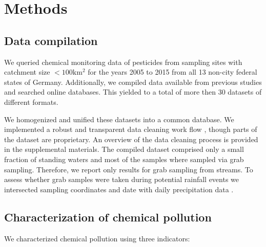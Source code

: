 \documentclass[journal=esthag,manuscript=article]{achemso}
\begin{document}
\section{Methods}
\subsection{Data compilation}

We queried chemical monitoring data of pesticides from sampling sites with catchment size $\mathrm{< 100km^2}$ for the years 2005 to 2015 from all 13 non-city federal states of Germany.
Additionally, we compiled data available from previous studies and searched online databases.
This yielded to a total of more then 30 datasets of different formats.

We homogenized and unified these datasets into a common database.
We implemented a robust and transparent data cleaning work flow \citep{poisot_best_2015}, though parts of the dataset are proprietary.
An overview of the data cleaning process is provided in the supplemental materials.  
The compiled dataset comprised only a small fraction of standing waters and most of the samples where sampled via grab sampling.
Therefore, we report  only results for grab sampling from streams.  
To assess whether  grab samples were taken during potential rainfall events we intersected sampling coordinates and date with daily precipitation data \citep{rauthe_central_2013}.

\subsection{Characterization of chemical pollution}
We characterized chemical pollution using three indicators:
\end{document}
